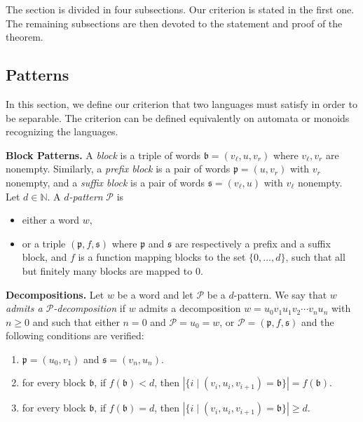 \documentclass{LMCS}
\newcommand\nat{\ensuremath{\mathbb{N}}\xspace}
\newcommand\Ps{\ensuremath{\mathcal{P}}\xspace}
\newcommand\decop[1]{\ensuremath{#1}-decomposition\xspace}
\newcommand\pfsdecomp{\decop{\Ps}}
\newcommand\frb{\ensuremath{\mathfrak{b}}\xspace}
\newcommand\frp{\ensuremath{\mathfrak{p}}\xspace}
\newcommand\frs{\ensuremath{\mathfrak{s}}\xspace}
\let\geq\geqslant
\theoremstyle{plain}
\begin{document}
\noindent The section is divided in four subsections. Our criterion is
stated in the first one. The remaining subsections are then devoted
to the statement and proof of the theorem. 

\subsection{Patterns}

In this section, we define our criterion that two languages must satisfy
in order to be separable. The criterion can be defined equivalently on
automata or monoids recognizing the languages.

\medskip\noindent
{\bf Block Patterns.} A \emph{block} is a triple of words
$\frb = (v_\ell,u,v_r)$ where $v_\ell,v_r$ are nonempty. Similarly, a
\emph{prefix block} is a pair of words $\frp=(u,v_r)$ with $v_r$
nonempty, and a \emph{suffix block} is a pair of words
$\frs=(v_\ell,u)$ with $v_\ell$ nonempty. Let $d\in\nat$. A
\emph{$d$-pattern} \Ps is
\begin{itemize}
\item either a word $w$,
\item or a triple $(\frp,f,\frs)$ where $\frp$ and
  $\frs$ are respectively a prefix and a suffix block, and $f$ is a
  function mapping blocks to the set $\{0,\dots,d\}$, such that all
  but finitely many blocks are mapped to $0$.
\end{itemize}
\medskip
\noindent
{\bf Decompositions.} Let $w$ be a word and let $\Ps$ be a $d$-pattern. We
say that \emph{$w$ admits a \pfsdecomp} if  $w$ admits a
decomposition $w = u_0v_1u_1v_2 \cdots v_nu_n$ with $n \geq 0$ and
such that either $n=0$ and $\Ps=u_0=w$, or $\Ps=(\frp,f,\frs)$ and the
following conditions are verified:
\begin{enumerate}
\item $\frp =(u_0,v_1)$ and $\frs = (v_n,u_n)$.
\item for every block $\frb$, if $f(\frb)<d$, then 
  $|\{i\mid(v_i,u_i,v_{i+1})=\frb\}|=f(\frb)$.
\item for every block $\frb$, if $f(\frb)=d$, then
  $|\{i\mid(v_i,u_i,v_{i+1})=\frb\}|\geq d$.
\end{enumerate}
\end{document}
